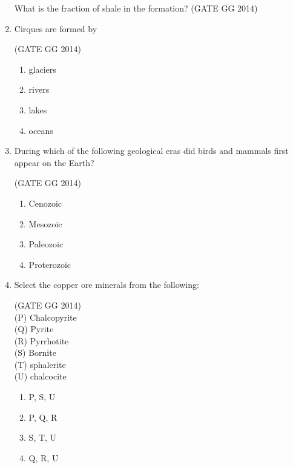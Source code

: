 \documentclass[journal]{IEEEtran}
\begin{document}
\begin{enumerate}[start=1]
What is the fraction of shale in the formation?
\hfill{(GATE GG 2014)}\\
\begin{enumerate}
\end{enumerate}

\item Cirques are formed by

\hfill{(GATE GG 2014)}\\
\begin{multicols}{4}
    \begin{enumerate}
    \item  glaciers
    \item rivers
\item  lakes
\item  oceans
\end{enumerate}
\end{multicols}


\item During which of the following geological eras did birds and mammals first appear on the Earth?

\hfill{(GATE GG 2014)}\\
\begin{multicols}{4}
    \begin{enumerate}
    \item  Cenozoic
\item  Mesozoic
\item  Paleozoic
\item  Proterozoic
\end{enumerate}
\end{multicols}



\item Select the copper ore minerals from the following:

\hfill{(GATE GG 2014)}\\
\hspace*{2cm}(P) Chalcopyrite\\
\hspace*{2cm}(Q) Pyrite\\
\hspace*{2cm}(R) Pyrrhotite\\
\hspace*{2cm}(S) Bornite\\
\hspace*{2cm}(T) sphalerite\\
\hspace*{2cm}(U) chalcocite\\
\begin{enumerate}
    \item  P, S, U
\item  P, Q, R
\item  S, T, U
\item  Q, R, U


\end{enumerate}
\end{enumerate}
\end{document}
